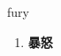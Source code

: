 
\begin{frame}
{\huge fury}
\begin{center}
\begin{enumerate}\Large
  \item \textbf{暴怒}
\end{enumerate}
\end{center}
\end{frame}
